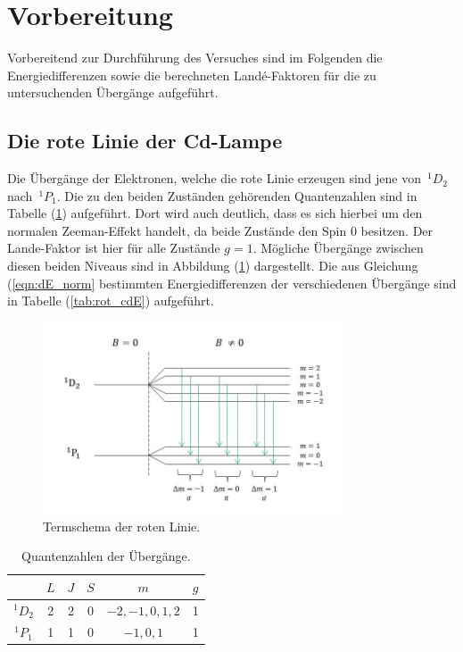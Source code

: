 \section{Vorbereitung}
\label{sec:vorbereitung}
Vorbereitend zur Durchführung des Versuches sind im Folgenden die Energiedifferenzen
sowie die berechneten Landé-Faktoren für die zu untersuchenden Übergänge aufgeführt.

\subsection{Die rote Linie der Cd-Lampe}
Die Übergänge der Elektronen, welche die rote Linie erzeugen sind jene von~$^{1}D_2$
nach~$^{1}P_1$. Die zu den beiden Zuständen gehörenden Quantenzahlen sind in
Tabelle (\ref{tab:rot_cd}) aufgeführt. Dort wird auch deutlich, dass es sich hierbei
um den normalen Zeeman-Effekt handelt, da beide Zustände den Spin $0$ besitzen. Der
Lande-Faktor ist hier für alle Zustände $g=1$. Mögliche Übergänge zwischen diesen
beiden Niveaus sind in Abbildung (\ref{fig:therm_rot}) dargestellt. Die aus
Gleichung (\ref{eqn:dE_norm} bestimmten Energiedifferenzen der verschiedenen
Übergänge sind in Tabelle (\ref{tab:rot_cdE}) aufgeführt.

\begin{figure}
    \centering
    \includegraphics[width=0.8\textwidth]{graphics/termschema_rot.jpg}
    \caption{Termschema der roten Linie.}
    \label{fig:therm_rot}
\end{figure}

\begin{table}[H]
    \centering
    \caption{Quantenzahlen der Übergänge.}
    \begin{tabular}{cccccc}
        \toprule
    {} & {$L$}  & {$J$}  & {$S$} & {$m$} & {$g$} \\
		\midrule
	  $^{1}D_2$ & 2 & 2 & 0 & $-2,-1,0,1,2$ & 1 \\
    $^{1}P_1$ & 1 & 1 & 0 & $-1,0,1$ & 1 \\
    \bottomrule
	\end{tabular}
    \label{tab:rot_cd}
\end{table}


